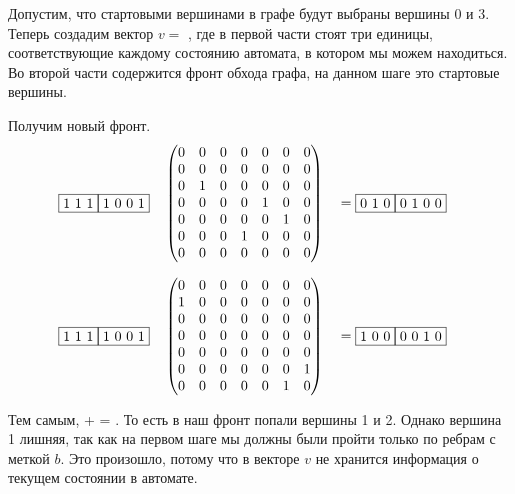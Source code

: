 \begin{example}
  Допустим, что стартовыми вершинами в графе будут выбраны вершины 0 и 3.
  Теперь создадим вектор $v = $  , где в первой части стоят три единицы, соответствующие каждому состоянию автомата, в котором мы можем находиться. Во второй части содержится фронт обхода графа, на данном шаге это стартовые вершины.
  
  Получим новый фронт.
  \begin{alignat*}{7}
    & \begin{matrix}
      \fbox{1 1 1} \fbox{1 0 0 1}
      \end{matrix}  && \begin{pmatrix}
        0 & 0 & 0 & 0 & 0 & 0 & 0 \\
        0 & 0 & 0 & 0 & 0 & 0 & 0 \\
        0 & 1 & 0 & 0 & 0 & 0 & 0 \\
        0 & 0 & 0 & 0 & 1 & 0 & 0 \\
        0 & 0 & 0 & 0 & 0 & 1 & 0 \\
        0 & 0 & 0 & 1 & 0 & 0 & 0 \\
        0 & 0 & 0 & 0 & 0 & 0 & 0 
        \end{pmatrix} &&= \begin{matrix}
          \fbox{0 1 0} \fbox{0 1 0 0} 
          \end{matrix}
    \end{alignat*}

  \begin{alignat*}{7}
    & \begin{matrix}
      \fbox{1 1 1} \fbox{1 0 0 1}
      \end{matrix}  && \begin{pmatrix}
        0 & 0 & 0 & 0 & 0 & 0 & 0 \\
        1 & 0 & 0 & 0 & 0 & 0 & 0 \\
        0 & 0 & 0 & 0 & 0 & 0 & 0 \\
        0 & 0 & 0 & 0 & 0 & 0 & 0 \\
        0 & 0 & 0 & 0 & 0 & 0 & 0 \\
        0 & 0 & 0 & 0 & 0 & 0 & 1 \\
        0 & 0 & 0 & 0 & 0 & 1 & 0 
        \end{pmatrix} &&= \begin{matrix}
          \fbox{1 0 0} \fbox{0 0 1 0}
          \end{matrix}
    \end{alignat*}

    Тем самым,   +   =  . То есть в наш фронт  попали вершины 1 и 2.
    Однако вершина 1 лишняя, так как на первом шаге мы должны были пройти только по ребрам с меткой $b$. Это произошло, потому что в векторе $v$ не хранится информация о текущем состоянии в автомате.


\end{example}
